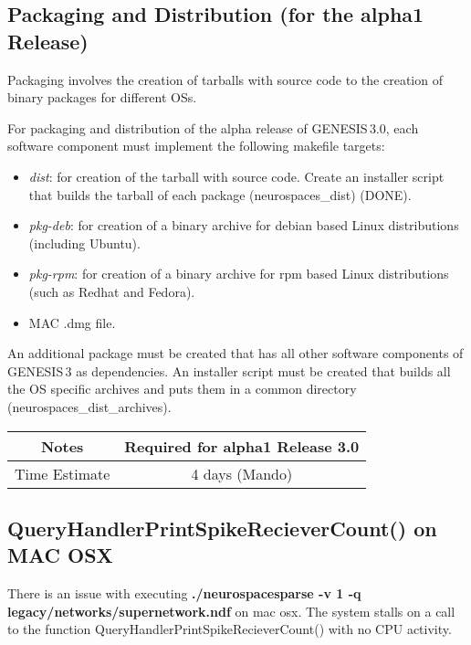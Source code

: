 \documentclass[12pt]{article}
\begin{document}
\subsection{Packaging and Distribution (for the alpha1 Release)}

Packaging involves the creation of tarballs with source code to the
creation of binary packages for different OSs.

For packaging and distribution of the alpha release of GENESIS\,3.0,
each software component must implement the following makefile targets:

\begin{itemize}
\item {\it dist}: for creation of the tarball with source code.
  Create an installer script that builds the tarball of each package
  (neurospaces\_dist) (DONE).
\item {\it pkg-deb}: for creation of a binary archive for debian based
  Linux distributions (including Ubuntu).
\item {\it pkg-rpm}: for creation of a binary archive for rpm based Linux
  distributions (such as Redhat and Fedora).
\item MAC .dmg file.
\end{itemize}

An additional package must be created that has all other software
components of GENESIS\,3 as dependencies.  An installer script must
be created that builds all the OS specific archives and puts them in a
common directory (neurospaces\_dist\_archives).

{
  \vspace{5mm}
  \centering
  \begin{tabular}{|c|c|}
    \hline
    Notes
    & Required for alpha1 Release 3.0 \\
    \hline
    Time Estimate
    & 4 days (Mando) \\
    \hline
  \end{tabular}
}



\subsection{QueryHandlerPrintSpikeRecieverCount() on MAC OSX}

There is an issue with executing {\bf ./neurospacesparse -v 1 -q
  legacy/networks/supernetwork.ndf} on mac osx. The system stalls on a
call to the function QueryHandlerPrintSpikeRecieverCount() with no CPU
activity.
\end{document}
